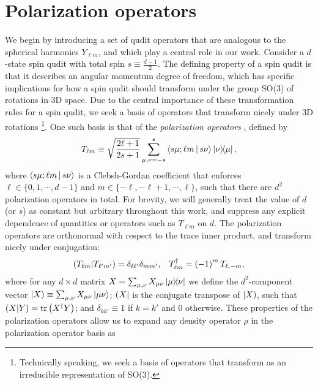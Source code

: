 \documentclass[notitlepage,twocolumn]{revtex4-2}
\newcommand{\f}[2]{\dfrac{#1}{#2}} %
\newcommand{\p}[1]{\left(#1\right)} %
\newcommand{\bk}{\Braket} %
\renewcommand{\set}[1]{\{#1\}} %
\def\obra#1{\mathinner{({#1}|}}
\def\oket#1{\mathinner{|{#1})}}
\def\obk#1{\mathinner{({#1})}}
\begin{document}

\section{Polarization operators}
\label{sec:polarization_ops}

We begin by introducing a set of qudit operators that are analogous to the spherical harmonics $Y_{\ell m}$, and which play a central role in our work.
Consider a $d$-state spin qudit with total spin $s\equiv\frac{d-1}{2}$.
The defining property of a spin qudit is that it describes an angular momentum degree of freedom, which has specific implications for how a spin qudit should transform under the group SO(3) of rotations in 3D space.
Due to the central importance of these transformation rules for a spin qudit, we seek a basis of operators that transform nicely under 3D rotations \footnote{Technically speaking, we seek a basis of operators that transform as an irreducible representation of SO(3).}.
One such basis is that of the {\it polarization operators} \cite{kryszewski2006positivity, bertlmann2008bloch}, defined by
\begin{align}
  T_{\ell m} \equiv \sqrt{\f{2\ell+1}{2s+1}} \sum_{\mu,\nu=-s}^s
  \bk{s\mu;\ell m|s\nu} \op{\nu}{\mu},
  \label{eq:trans_op}
\end{align}
where $\bk{s\mu;\ell m|s\nu}$ is a Clebsh-Gordan coefficient that enforces $\ell\in\set{0,1,\cdots,d-1}$ and $m\in\set{-\ell,-\ell+1,\cdots,\ell}$, such that there are $d^2$ polarization operators in total.
For brevity, we will generally treat the value of $d$ (or $s$) as constant but arbitrary throughout this work, and suppress any explicit dependence of quantities or operators such as $T_{\ell m}$ on $d$.
The polarization operators are orthonormal with respect to the trace inner product, and transform nicely under conjugation:
\begin{align}
  \obk{T_{\ell m }|T_{\ell'm'}}
  = \delta_{\ell\ell'} \delta_{mm'},
  &&
  T_{\ell m}^\dag = \p{-1}^m T_{\ell,-m},
\end{align}
where for any $d\times d$ matrix $X=\sum_{\mu,\nu} X_{\mu\nu} \op{\mu}{\nu}$ we define the $d^2$-component vector $\oket{X} \equiv \sum_{\mu,\nu} X_{\mu\nu} \ket{\mu\nu}$; $\obra{X}$ is the conjugate transpose of $\oket{X}$, such that $\obk{X|Y}=\tr\p{X^\dag Y}$; and $\delta_{kk'}\equiv 1$ if $k=k'$ and $0$ otherwise.
These properties of the polarization operators allow us to expand any density operator $\rho$ in the polarization operator basis as
\end{document}
